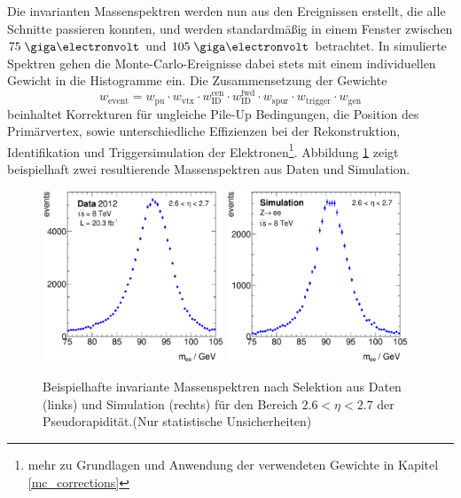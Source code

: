 Die invarianten Massenspektren werden nun aus den Ereignissen erstellt, die
alle Schnitte passieren konnten, und werden standardmäßig in einem Fenster
zwischen $75 \GeV$ und $105 \GeV$ betrachtet. In simulierte Spektren gehen die
Monte-Carlo-Ereignisse dabei stets mit einem individuellen Gewicht in die
Histogramme ein. Die Zusammensetzung der Gewichte 
\begin{equation}
    w_\text{event} = w_\text{pu} \cdot w_\text{vtx} \cdot
                     w_\text{ID}^\text{cen} \cdot w_\text{ID}^\text{fwd} \cdot
                     w_\text{spur} \cdot w_\text{trigger} \cdot w_\text{gen}
    \label{eq:calibration_weights}
\end{equation}
beinhaltet Korrekturen für ungleiche Pile-Up Bedingungen, die Position des
Primärvertex, sowie unterschiedliche Effizienzen bei der Rekonstruktion,
Identifikation und Triggersimulation der Elektronen\footnote{mehr zu Grundlagen
und Anwendung der verwendeten Gewichte in Kapitel
\ref{mc_corrections}}. Abbildung \ref{fig:example_mee_p26} zeigt beispielhaft
zwei resultierende Massenspektren aus Daten und Simulation.

\begin{figure}
    \centering
    \includegraphics[width=0.48\textwidth]{plots/example_mee_data_p26}
    \hfill
    \includegraphics[width=0.48\textwidth]{plots/example_mee_mc_p26}
    \caption[Beispielhafte invariante Massenspektren nach Selektion aus Daten
        und Simulation für den Bereich $2.6 < \eta < 2.7$ der Pseudorapidität]
        {Beispielhafte invariante Massenspektren nach Selektion aus Daten
        (links) und Simulation (rechts) für den Bereich $2.6 < \eta < 2.7$ der
            Pseudorapidität.(Nur statistische Unsicherheiten)}
    \label{fig:example_mee_p26}
\end{figure}

